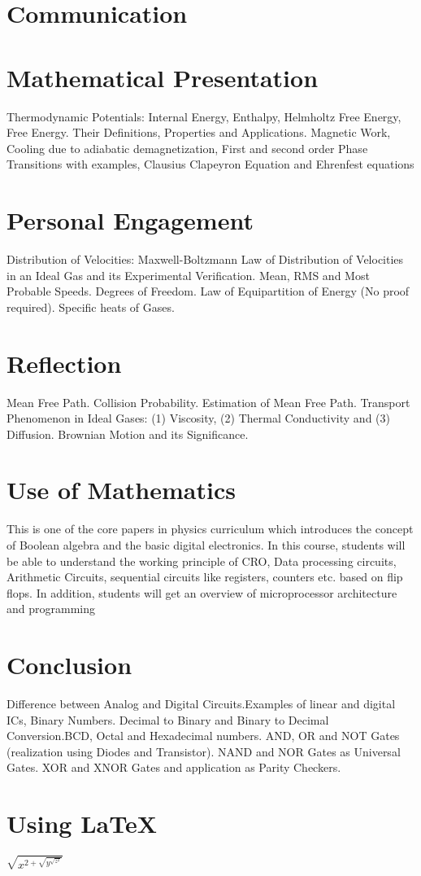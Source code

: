 \documentclass[11pt]{article}
\begin{document}
\section{Communication}


\section{Mathematical Presentation}
Thermodynamic Potentials: Internal Energy, Enthalpy, Helmholtz Free Energy, Free Energy. Their Definitions, Properties and Applications. Magnetic Work, Cooling due to adiabatic demagnetization, First and second order Phase Transitions with examples, Clausius Clapeyron Equation and Ehrenfest equations

\section{Personal Engagement}
Distribution of Velocities: Maxwell-Boltzmann Law of Distribution of Velocities in an Ideal Gas and its Experimental Verification. Mean, RMS and Most Probable Speeds. Degrees of Freedom. Law of Equipartition of Energy (No proof required). Specific heats of Gases.

\section{Reflection}
Mean Free Path. Collision Probability. Estimation of Mean Free Path. Transport Phenomenon in Ideal Gases: (1) Viscosity, (2) Thermal Conductivity and (3) Diffusion. Brownian Motion and its Significance.

\section{Use of Mathematics}
This is one of the core papers in physics curriculum which introduces the concept of Boolean algebra and the basic digital electronics. In this course, students will be able to understand the working principle of CRO, Data processing circuits, Arithmetic Circuits, sequential circuits like registers, counters etc. based on flip flops. In addition, students will get an overview of microprocessor architecture and programming

\section{Conclusion}
Difference between Analog and Digital Circuits.Examples of linear and digital ICs, Binary Numbers. Decimal to Binary and Binary to Decimal Conversion.BCD, Octal and Hexadecimal numbers. AND, OR and NOT Gates (realization using Diodes and Transistor). NAND and NOR Gates as Universal Gates. XOR and XNOR Gates and application as Parity Checkers.

\section{Using \LaTeX}
$\sqrt{x^{2+\sqrt{y^{\sqrt{z^2}}}}}$
\end{document}
